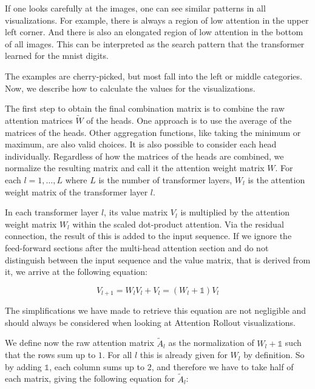 \documentclass[a4paper]{scrartcl}
\begin{document}
    If one looks carefully at the images, one can see similar patterns in all visualizations.
    For example, there is always a region of low attention in the upper left corner.
    And there is also an elongated region of low attention in the bottom of all images.
    This can be interpreted as the search pattern that the transformer learned for the mnist digits.

    The examples are cherry-picked, but most fall into the left or middle categories.
    Now, we describe how to calculate the values for the visualizations.

    The first step to obtain the final combination matrix is to combine the raw attention matrices $\tilde{W}$ of the heads.
    One approach is to use the average of the matrices of the heads.
    Other aggregation functions, like taking the minimum or maximum, are also valid choices.
    It is also possible to consider each head individually.
    Regardless of how the matrices of the heads are combined, we normalize the resulting matrix and call it the attention weight matrix $W$.
    For each $l = 1, \dots, L$ where $L$ is the number of transformer layers, $W_l$ is the attention weight matrix of the transformer layer $l$.

    In each transformer layer $l$, its value matrix $V_l$ is multiplied by the attention weight matrix $W_l$ within the scaled dot-product attention.
    Via the residual connection, the result of this is added to the input sequence.
    If we ignore the feed-forward sections after the multi-head attention section and do not distinguish between the input sequence and the value matrix, that is derived from it, we arrive at the following equation:

    \begin{equation}
        V_{l+1} = W_l V_l + V_l = (W_l + \mathds{1})V_l
    \end{equation}

    The simplifications we have made to retrieve this equation are not negligible and should always be considered when looking at Attention Rollout visualizations.

    We define now the raw attention matrix $\tilde{A}_l$ as the normalization of $W_l + \mathds{1}$ such that the rows sum up to $1$.
    For all $l$ this is already given for $W_l$ by definition.
    So by adding $\mathds{1}$, each column sums up to $2$, and therefore we have to take half of each matrix, giving the following equation for $\tilde{A}_l$:
\end{document}
